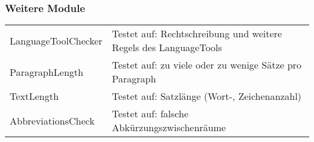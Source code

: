 \begin{frame}[fragile]
\frametitle{Weitere Module}
\begin{block}{\vspace*{-3ex}}
\begin{table}[h]
	\begin{tabular}{l|p{7cm}}
			LanguageToolChecker & Testet auf: Rechtschreibung und weitere Regels des LanguageTools\\
			ParagraphLength & Testet auf: zu viele oder zu wenige Sätze pro Paragraph\\
			TextLength & Testet auf: Satzlänge (Wort-, Zeichenanzahl)\\
			AbbreviationsCheck & Testet auf: falsche Abkürzungszwischenräume 
	\end{tabular}
\end{table}
\end{block}
\end{frame}